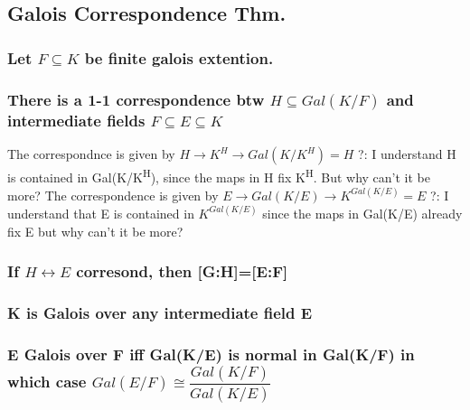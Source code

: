 \documentclass[11pt]{article}
\begin{document}
\subsection{Galois Correspondence Thm.}
\label{sec:orgbd3f4a1}
\subsubsection*{Let \(F \subseteq K\) be finite galois extention.}
\label{sec:orgbb8e6bf}
\subsubsection*{There is a 1-1 correspondence btw \(H \subseteq Gal(K/F)\) and intermediate fields \(F \subseteq E \subseteq K\)}
\label{sec:orgbc0e02a}
The correspondnce is given by \(H \rightarrow K^H \rightarrow Gal(K/K^H)=H\)
?: I understand H is contained in Gal(K/K\textsuperscript{H}), since the maps in H fix K\textsuperscript{H}. But why can't it be more?
The correspondence is given by \(E \rightarrow Gal(K/E) \rightarrow K^{Gal(K/E)} = E\)
?: I understand that E is contained in \(K^{Gal(K/E)}\) since the maps in Gal(K/E) already fix E but why can't it be more?
\subsubsection*{If \(H \leftrightarrow E\) corresond, then [G:H]=[E:F]}
\label{sec:org7f41fa3}
\subsubsection*{K is Galois over any intermediate field E}
\label{sec:org9efcd34}
\subsubsection*{E Galois over F iff Gal(K/E) is normal in Gal(K/F) in which case \(Gal(E/F) \cong \dfrac{Gal(K/F)}{Gal(K/E)}\)}
\label{sec:org8766d97}
\end{document}
